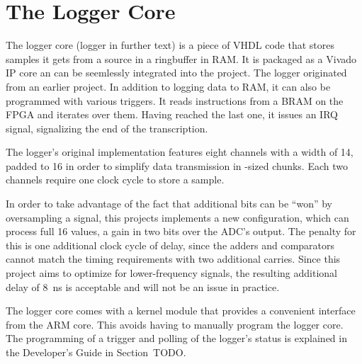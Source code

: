 %
%
\section{The Logger Core} %
\label{sec:fpga:logger}

The logger core (logger  in further text) is a piece of  VHDL code that stores
samples it  gets from a  source in  a ringbuffer in  RAM. It is packaged  as a
Vivado IP core an can be seemlessly integrated into the project.
The logger originated  from an earlier project.%
In addition  to logging data  to RAM, it can  also be programmed  with various
triggers. It reads  instructions from  a BRAM  on the  FPGA and  iterates over
them. Having reached  the last one, it  issues an IRQ signal,  signalizing the
end of the transcription.

The logger's original  implementation features eight channels with  a width of
\SI{14}{\bit}, padded to \SI{16}{\bit} in  order to simplify data transmission
in \si{\byte}-sized chunks. Each two channels require one clock cycle to store
a sample.

In order to take advantage of the  fact that additional bits can be ``won'' by
oversampling a signal, this projects implements a new configuration, which can
process full \SI{16}{\bit}  values, a gain in two bits  over the ADC's output.
The penalty for this is one additional  clock cycle of delay, since the adders
and  comparators cannot  match  the timing  requirements  with two  additional
carries.  Since this project aims to optimize for lower-frequency signals, the
resulting additional delay of \SI{8}{\nano\second}  is acceptable and will not
be an issue in practice.

The  logger  core comes  with  a  kernel  module  that provides  a  convenient
interface from the ARM core. This avoids having to manually program the logger
core. The  programming of  a trigger  and polling  of the  logger's status  is
explained in the Developer's Guide in Section~TODO.

%
%
